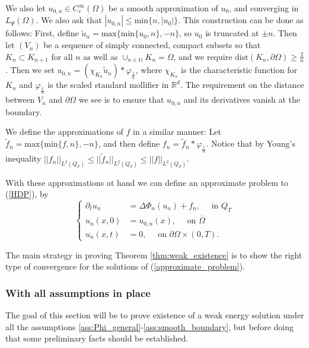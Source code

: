 \documentclass[11pt, a4paper]{article}
\begin{document}
We also let $u_{0,n}\in C^\infty_c(\Omega)$ be a smooth approximation of $u_0$, and converging in $L_\Psi(\Omega)$. We also ask that $|u_{0,n}| \leq \mathrm{min}\{n,|u_0|\}$.
This construction can be done as follows: First, define $\tilde{u}_n = \mathrm{max}\{ \mathrm{min}\{u_0, n\}, -n\}$, so $u_0$ is truncated at $\pm n$. Then let $(V_n)$ be a sequence of simply connected, compact subsets so that $K_n \subset K_{n+1}$ for all $n$ as well as $\cup_{n\in \mathbb{N}}K_n = \Omega$, and we require $\mathrm{dist}(K_n,\partial \Omega) \geq \frac{2}{n}$. Then we set $u_{0,n}= (\chi_{K_n}\tilde{u}_n)*\varphi_{\frac{1}{n}}$, where $\chi_{K_n}$ is the characteristic function for $K_n$ and $\varphi_{\frac{1}{n}}$ is the scaled standard mollifier in $\mathbb{R}^d$. The requirement on the distance between $V_n$ and $\partial \Omega$ we see is to ensure that $u_{0,n}$ and its derivatives vanish at the boundary. 

We define the approximations of $f$ in a similar manner: Let $\tilde{f}_n = \mathrm{max}\{ \mathrm{min}\{f,n \}, -n\}$, and then define $f_n = \tilde{f}_n * \varphi_{\frac{1}{n}}$.
Notice that by Young's inequality $||f_n||_{L^2(Q_T)} \leq ||\tilde{f}_n||_{L^2(Q_T)} \leq ||f||_{L^2(Q_T)}$.

With these approximations at hand we can define an approximate problem to (\ref{HDP}), by
 \begin{equation}
	\label{approximate_problem}
	\begin{cases}
	\partial_t u_n &= \Delta\Phi_n(u_n) + f_n, \quad \text{ in } Q_T \\
	u_n(x,0) &= u_{0,n}(x),	\quad \text{ on } \overline{\Omega} \\
	u_n(x,t) &= 0, \quad \text{ on }  \partial \Omega \times (0,T).
	\end{cases}
\end{equation}


The main strategy in proving Theorem \ref{thm:weak_existence} is to show the right type of convergence for the solutions of (\ref{approximate_problem}). 
\subsubsection{With all assumptions in place}
The goal of this section will be to prove existence of a weak energy solution under all the assumptions \ref{ass:Phi_general}-\ref{ass:smooth_boundary}, but before doing that some preliminary facts should be established.
\end{document}
